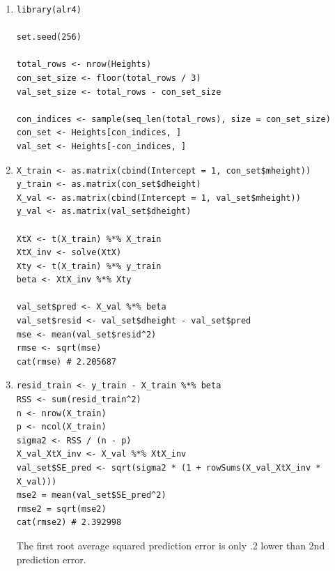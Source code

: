 \documentclass{article}
\let \extra T
\begin{document}
\newpage
\begin{Exercise}
    \begin{enumerate}
        \if \extra T
        \item
              \begin{verbatim}
library(alr4)

set.seed(256) 

total_rows <- nrow(Heights)
con_set_size <- floor(total_rows / 3)
val_set_size <- total_rows - con_set_size

con_indices <- sample(seq_len(total_rows), size = con_set_size)
con_set <- Heights[con_indices, ]
val_set <- Heights[-con_indices, ]
        \end{verbatim}

        \item
              \begin{verbatim}
X_train <- as.matrix(cbind(Intercept = 1, con_set$mheight))
y_train <- as.matrix(con_set$dheight)
X_val <- as.matrix(cbind(Intercept = 1, val_set$mheight))
y_val <- as.matrix(val_set$dheight)

XtX <- t(X_train) %*% X_train
XtX_inv <- solve(XtX)
Xty <- t(X_train) %*% y_train
beta <- XtX_inv %*% Xty

val_set$pred <- X_val %*% beta
val_set$resid <- val_set$dheight - val_set$pred
mse <- mean(val_set$resid^2)
rmse <- sqrt(mse)
cat(rmse) # 2.205687
        \end{verbatim}
        \item
              \begin{verbatim}
resid_train <- y_train - X_train %*% beta
RSS <- sum(resid_train^2)
n <- nrow(X_train)
p <- ncol(X_train)
sigma2 <- RSS / (n - p)
X_val_XtX_inv <- X_val %*% XtX_inv
val_set$SE_pred <- sqrt(sigma2 * (1 + rowSums(X_val_XtX_inv * X_val)))
mse2 = mean(val_set$SE_pred^2)
rmse2 = sqrt(mse2)
cat(rmse2) # 2.392998
\end{verbatim}

              The first root average squared prediction error is only .2 lower than 2nd prediction error.

              \fi


    \end{enumerate}
\end{Exercise}

\end{document}
